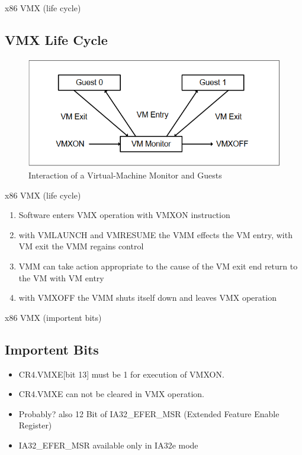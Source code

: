 \documentclass[11pt, aspectratio=169, modernfonts]{beamer}
\theoremstyle{definition}
\theoremstyle{remark}
\begin{document}
\begin{frame}{x86 VMX (life cycle)
\cite{architecture64_sof_dev_manuel_vol_3}}
    \subsection{VMX Life Cycle}
    \begin{figure}
        \centering
        \includegraphics[scale = 0.6]{graphics/vmx_life_cycle.png}
        \caption{Interaction of a Virtual-Machine Monitor and Guests \cite{architecture64_sof_dev_manuel_vol_3}}
        \label{fig:vmx_life_cycle}
    \end{figure}
\end{frame}

\begin{frame}{x86 VMX (life cycle)
\cite{architecture64_sof_dev_manuel_vol_3}}
    \begin{enumerate}
        \item Software enters VMX operation with VMXON instruction
        \item with VMLAUNCH and VMRESUME the VMM effects the VM entry, with VM exit the VMM regains control 
        \item VMM can take action appropriate to the cause of the VM exit end return to the VM with VM entry
        \item with VMXOFF the VMM shuts itself down and leaves VMX operation
    \end{enumerate}
\end{frame}


\begin{frame}{x86 VMX (importent bits)
\cite{architecture64_sof_dev_manuel_vol_3}}
    \subsection{Importent Bits}
    \begin{itemize}
        \item CR4.VMXE[bit 13] must be 1 for execution of VMXON.
        \item CR4.VMXE can not be cleared in VMX operation.
        \item Probably? also 12 Bit of IA32\_EFER\_MSR (Extended Feature Enable Register)
        \item IA32\_EFER\_MSR available only in IA32e mode
    \end{itemize}
\end{frame}
\end{document}
